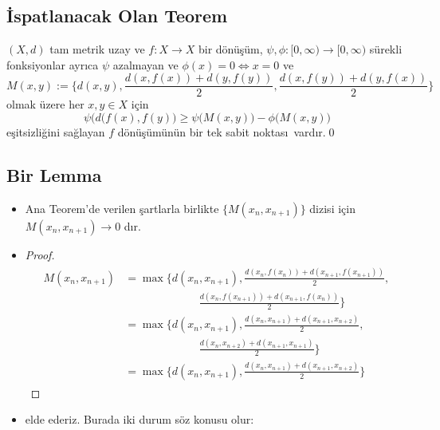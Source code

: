 \documentclass[sans,mathserif,8pt]{beamer}
\begin{document}
\subsection{\.{I}spatlanacak Olan Teorem}
\begin{frame}
  \begin{theorem}
    $(X,d)$  tam metrik uzay ve $f: X \rightarrow X$ bir d\"{o}n\"{u}\c{s}\"{u}m, $\psi,\phi : [0,\infty)\to [0,\infty)$ s\"urekli fonksiyonlar ayr\i ca $\psi$ azalmayan ve $\phi(x)=0 \iff x=0$ ve $$M(x,y):=\bigg\{ d(x,y), \frac{d(x,f(x))+d(y,f(y))}{2}, \frac{d(x,f(y))+d(y,f(x))}{2} \bigg\}$$ olmak \"{u}zere her $x,y \in X$ i\c{c}in $$\psi\big(d(f(x),f(y)\big)\geq \psi\big(M(x,y)\big)-\phi\big(M(x,y)\big)$$ e\c{s}itsizli\u{g}ini sa\u{g}layan $f$ d\"{o}n\"{u}\c{s}\"{u}m\"un\"un bir tek sabit noktas\i\ vard\i r.\qed 
  \end{theorem}
\end{frame}%


\subsection{Bir Lemma}
\begin{frame}
\begin{itemize}[<+-| alert@+>]  
  \item[] 
  \begin{lemma}
    Ana Teorem'de verilen \c{s}artlarla birlikte $\{M(x_n,x_{n+1})\}$ dizisi i\c{c}in $M(x_n,x_{n+1})\rightarrow 0$ d\i r.
  \end{lemma}

  \item[] 
    \begin{proof}
      \begin{align}
        \begin{split}
          M(x_n,x_{n+1})&=\max\bigg\{
          d(x_n,x_{n+1}),\frac{d(x_n,f(x_n))+d(x_{n+1},f(x_{n+1}))}{2},\\
          &\hspace{80pt} \frac{d(x_n,f(x_{n+1}))+d(x_{n+1},f(x_{n}))}{2} \bigg\}\\
          &=\max\bigg\{
          d(x_n,x_{n+1}),\frac{d(x_n,x_{n+1})+d(x_{n+1},x_{n+2})}{2},\\
          &\hspace{80pt} \frac{d(x_n,x_{n+2})+d(x_{n+1},x_{n+1})}{2} \bigg\}\\
          &=\max\bigg\{
          d(x_n,x_{n+1}),\frac{d(x_n,x_{n+1})+d(x_{n+1},x_{n+2})}{2}\bigg\}
        \end{split}
      \end{align}
    \end{proof}
  \item[] elde ederiz. Burada iki durum s\"oz konusu olur:
\end{itemize}
\end{frame}%
\end{document}
